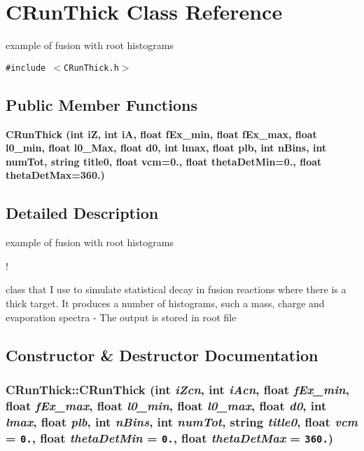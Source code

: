 \section{CRun\-Thick Class Reference}
\label{classCRunThick}
example of fusion with root histograms  


{\tt \#include $<$CRun\-Thick.h$>$}

\subsection*{Public Member Functions}
\begin{CompactItemize}
\item 
\bf{CRun\-Thick} (int i\-Z, int i\-A, float f\-Ex\_\-min, float f\-Ex\_\-max, float l0\_\-min, float l0\_\-Max, float d0, int lmax, float plb, int n\-Bins, int num\-Tot, string title0, float vcm=0., float theta\-Det\-Min=0., float theta\-Det\-Max=360.)
\end{CompactItemize}


\subsection{Detailed Description}
example of fusion with root histograms 

!

class that I use to simulate statistical decay in fusion reactions where there is a thick target. It produces a number of histograms, such a mass, charge and evaporation spectra - The output is stored in root file 



\subsection{Constructor \& Destructor Documentation}
\subsubsection{\setlength{\rightskip}{0pt plus 5cm}CRun\-Thick::CRun\-Thick (int {\em i\-Zcn}, int {\em i\-Acn}, float {\em f\-Ex\_\-min}, float {\em f\-Ex\_\-max}, float {\em l0\_\-min}, float {\em l0\_\-max}, float {\em d0}, int {\em lmax}, float {\em plb}, int {\em n\-Bins}, int {\em num\-Tot}, string {\em title0}, float {\em vcm} = {\tt 0.}, float {\em theta\-Det\-Min} = {\tt 0.}, float {\em theta\-Det\-Max} = {\tt 360.})}\label{classCRunThick_e3d2dd1c5910701d1859181a67036be0}


